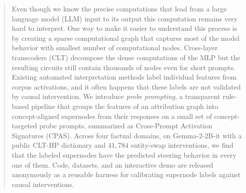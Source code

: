 \documentclass{article}
\theoremstyle{plain}
\theoremstyle{definition}
\theoremstyle{remark}
\begin{document}
\begin{abstract}
Even though we know the precise computations that lead from a large language model (LLM) input to its output this computation remains very hard to interpret. One way to make it easier to understand this process is by creating a sparse computational graph that captures most of the model behavior with smallest number of computational nodes. Cross-layer transcoders (CLT) decompose the dense computations of the MLP but the resulting circuits still contain thousands of nodes even for short prompts. Existing automated interpretation methods label individual features from corpus activations, and it often happens that these labels are not validated by causal intervention. We introduce \emph{probe prompting}, a transparent rule-based pipeline that groups the features of an attribution graph into concept-aligned supernodes from their responses on a small set of concept-targeted probe prompts, summarized as Cross-Prompt Activation Signatures (CPAS). Across four factual domains, on Gemma-2-2B-it with a public CLT-HP dictionary and $41{,}784$ entity-swap interventions, we find that the labeled supernodes have the predicted steering behavior in every one of them.
Code, datasets, and an interactive demo are released anonymously as a reusable harness for calibrating supernode labels against causal interventions.
\end{abstract}











\appendix
\onecolumn


\end{document}
